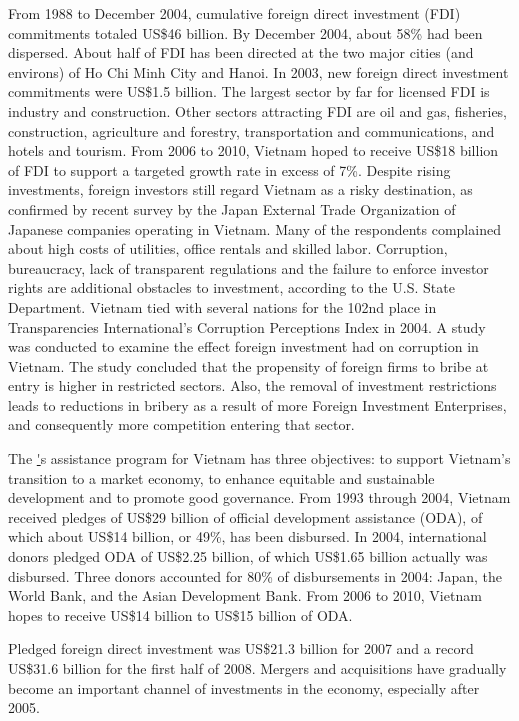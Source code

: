 \documentclass[openany]{book}
\begin{document}
From 1988 to December 2004, cumulative foreign direct investment (FDI) commitments totaled US\$46 billion. By December 2004, about 58\% had been dispersed. About half of FDI has been directed at the two major cities (and environs) of Ho Chi Minh City and Hanoi. In 2003, new foreign direct investment commitments were US\$1.5 billion. The largest sector by far for licensed FDI is industry and construction. Other sectors attracting FDI are oil and gas, fisheries, construction, agriculture and forestry, transportation and communications, and hotels and tourism. From 2006 to 2010, Vietnam hoped to receive US\$18 billion of FDI to support a targeted growth rate in excess of 7\%. Despite rising investments, foreign investors still regard Vietnam as a risky destination, as confirmed by recent survey by the Japan External Trade Organization of Japanese companies operating in Vietnam. Many of the respondents complained about high costs of utilities, office rentals and skilled labor. Corruption, bureaucracy, lack of transparent regulations and the failure to enforce investor rights are additional obstacles to investment, according to the U.S. State Department. Vietnam tied with several nations for the 102nd place in Transparencies International's Corruption Perceptions Index in 2004.\cite{36} A study was conducted to examine the effect foreign investment had on corruption in Vietnam. The study concluded that the propensity of foreign firms to bribe at entry is higher in restricted sectors. Also, the removal of investment restrictions leads to reductions in bribery as a result of more Foreign Investment Enterprises, and consequently more competition entering that sector.\cite{124}

The \href{World Bank}'s assistance program for Vietnam has three objectives: to support Vietnam's transition to a market economy, to enhance equitable and sustainable development and to promote good governance. From 1993 through 2004, Vietnam received pledges of US\$29 billion of official development assistance (ODA), of which about US\$14 billion, or 49\%, has been disbursed. In 2004, international donors pledged ODA of US\$2.25 billion, of which US\$1.65 billion actually was disbursed. Three donors accounted for 80\% of disbursements in 2004: Japan, the World Bank, and the Asian Development Bank. From 2006 to 2010, Vietnam hopes to receive US\$14 billion to US\$15 billion of ODA.\cite{36}

Pledged foreign direct investment was US\$21.3 billion for 2007 and a record US\$31.6 billion for the first half of 2008.\cite{97} Mergers and acquisitions have gradually become an important channel of investments in the economy, especially after 2005.
\end{document}
